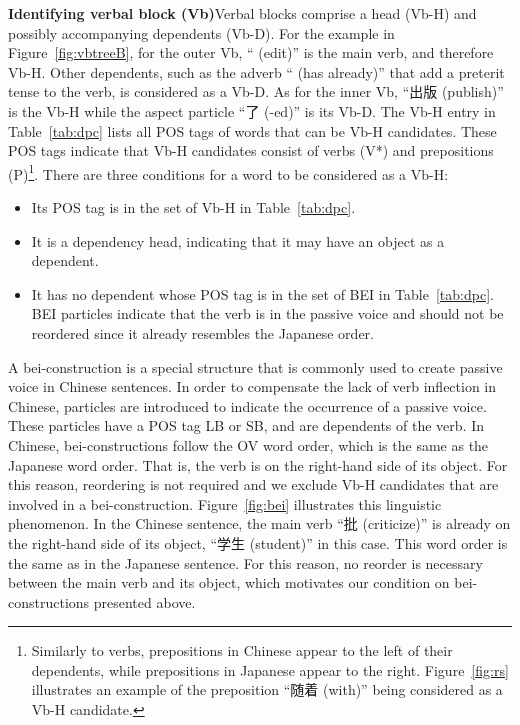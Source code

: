 \documentclass[english]{jnlp_1.4}
\begin{document}
{\bf Identifying verbal block (Vb)}\quad Verbal blocks comprise a head (Vb-H)
and possibly accompanying dependents (Vb-D). For the example in Figure~\ref{fig:vbtreeB},
for the outer Vb, `` (edit)'' is the main verb, and therefore Vb-H. 
Other dependents, such as the adverb `` (has already)'' that add a preterit 
tense to the verb, is considered as a Vb-D. As for the inner Vb, ``出版 (publish)''
is the Vb-H while the aspect particle ``了 (-ed)'' is its Vb-D. The Vb-H entry 
in Table~\ref{tab:dpc} lists all POS tags of words that can be Vb-H candidates.
These POS tags indicate that Vb-H candidates consist of verbs (V*) and prepositions (P)\footnote{Similarly to verbs, prepositions
in Chinese appear to the left of their dependents, while prepositions in Japanese appear to the right.
Figure~\ref{fig:rs} illustrates an example of the preposition ``随着 (with)'' being considered as a Vb-H candidate.}.
There are three conditions for a word to be considered as a Vb-H:

\begin{itemize}
\item Its POS tag is in the set of Vb-H in Table~\ref{tab:dpc}. 
\item It is a dependency head, indicating that it may have an object as a dependent.
\item It has no dependent whose POS tag is in the set of BEI in Table~\ref{tab:dpc}.
BEI particles indicate that the verb is in the passive voice and
should not be reordered since it already resembles the Japanese order. 
\end{itemize}

A bei-construction is a special structure that is commonly used to create
passive voice in Chinese sentences.
In order to compensate the lack of verb inflection in Chinese,
particles are introduced to indicate the occurrence of a passive voice. 
These particles have a POS tag LB or SB, and are dependents of the verb.
In Chinese, bei-constructions follow the OV word order,
which is the same as the Japanese word order.
That is, the verb is on the right-hand side of its object.
For this reason, reordering is not required and we exclude Vb-H candidates that are involved in 
a bei-construction. Figure~\ref{fig:bei} illustrates this linguistic phenomenon.
In the Chinese sentence, the main verb ``批 (criticize)''
is already on the right-hand side of its object, ``学生 (student)'' in this case.
This word order is the same as in the Japanese sentence.
For this reason, no reorder is necessary between the main verb and its object,
which motivates our condition on bei-constructions presented above.
\end{document}
